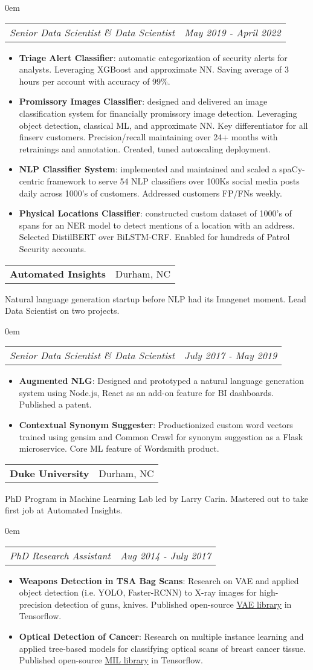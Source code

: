 \documentclass[letterpaper,11pt]{article}
\makeatletter
\newcommand{\resumeItem}[2]{
  \item\small{
    \textbf{#1}{: #2 \vspace{-2pt}}
  }
}
\newcommand{\resumeSubSubheading}[2]{
   \begin{addmargin}[1em]{0em}
    \begin{tabular*}{0.97\textwidth}{l@{\extracolsep{\fill}}r}
      \textit{#1} & \textit{\small #2} \\
    \end{tabular*}\vspace{-5pt}
    \end{addmargin}
}
\newcommand{\resumeItemListStart}{\begin{itemize}}
\newcommand{\resumeItemListEnd}{\end{itemize}\vspace{-5pt}}
\newcommand{\resumeJob}[3]{
   \vspace{3pt}
    \begin{tabular*}{0.97\textwidth}{l@{\extracolsep{\fill}}r}
      \textbf{#1} & #2 \\
    \end{tabular*}\vspace{4pt}
   \small{#3} \vspace{6pt}
}
\makeatother
\begin{document}
\resumeSubSubheading{Senior Data Scientist \& Data Scientist}{May 2019 - April 2022}
      \resumeItemListStart
        \resumeItem{Triage Alert Classifier}
          {automatic categorization of security alerts for analysts. Leveraging XGBoost and approximate NN. Saving average of 3 hours per account with accuracy of 99\%.}
        \resumeItem{Promissory Images Classifier}{designed and delivered an image classification system for financially promissory image detection. Leveraging object detection, classical ML, and approximate NN. Key differentiator for all finserv customers. Precision/recall maintaining over 24+ months with retrainings and annotation. Created, tuned autoscaling deployment.}
	\resumeItem{NLP Classifier System}{implemented and maintained and scaled a spaCy-centric framework to
serve 54 NLP classifiers over 100Ks social media posts daily across 1000's of customers. Addressed customers FP/FNs weekly.}
	\resumeItem{Physical Locations Classifier}{constructed custom dataset of 1000's of spans for an NER model to detect mentions of a location
with an address. Selected DistilBERT over BiLSTM-CRF. Enabled for hundreds of Patrol Security accounts.}
      \resumeItemListEnd

\smallskip
\smallskip


\resumeJob{Automated Insights}{Durham, NC}{Natural language generation startup before NLP had its Imagenet moment. Lead Data Scientist on two projects.}

\resumeSubSubheading{Senior Data Scientist \& Data Scientist}{July 2017 - May 2019}
      \resumeItemListStart
        \resumeItem{Augmented NLG}
          {Designed and prototyped a natural language generation system using Node.js, React as an add-on feature for BI dashboards. Published a patent.}
        \resumeItem{Contextual Synonym Suggester}
          {Productionized custom word vectors trained using gensim and Common Crawl for synonym suggestion as a Flask microservice. Core ML feature of Wordsmith product.}
      \resumeItemListEnd


\smallskip
\smallskip

\resumeJob{Duke University}{Durham, NC}{PhD Program in Machine Learning Lab led by Larry Carin. Mastered out to take first job at Automated Insights.}

\resumeSubSubheading{PhD Research Assistant}{Aug 2014 - July 2017}
      \resumeItemListStart
        \resumeItem{Weapons Detection in TSA Bag Scans}
          {Research on VAE and applied object detection (i.e. YOLO, Faster-RCNN) to X-ray images for high-precision detection of guns, knives. Published open-source \href{https://github.com/dancsalo/TensorFlow-VAE}{VAE library} in Tensorflow.}
        \resumeItem{Optical Detection of Cancer}
          {Research on multiple instance learning and applied tree-based models for classifying optical scans of breast cancer tissue. Published open-source \href{https://github.com/dancsalo/TensorFlow-MIL}{MIL library} in Tensorflow.}
      \resumeItemListEnd
\end{document}
